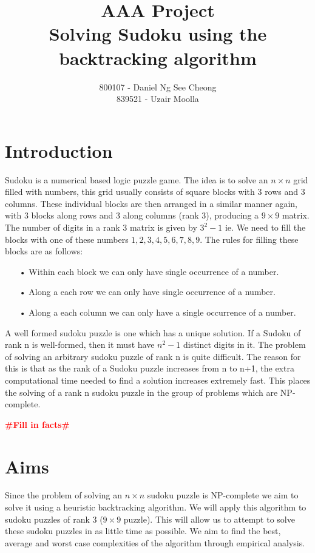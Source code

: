 \documentclass[12pt,a4paper,titlepage]{article}
\author{800107 - Daniel Ng See Cheong\\
		839521 - Uzair Moolla}
\title{
	AAA Project\\
	\large Solving Sudoku using the backtracking algorithm
}
\newcommand{\todo}[1]{\textcolor{red}{\textbf{\##1\#}}}
\begin{document}
\maketitle

\section{Introduction}
Sudoku is a numerical based logic puzzle game. The idea is to solve an $n\times n$ grid filled with numbers, this grid usually consists of square blocks with 3 rows and 3 columns. These individual blocks are then arranged in a similar manner again, with 3 blocks along rows and 3 along columns (rank 3), producing a $9 \times 9$ matrix. The number of digits in a rank 3 matrix is given by $3^2-1$ ie. We need to fill the blocks with one of these numbers ${1,2,3,4,5,6,7,8,9}$. The rules for filling these blocks are as follows:
\begin{itemize}
\item[•] Within each block we can only have single occurrence of a number.
\item[•] Along a each row we can only have single occurrence of a number.
\item[•] Along a each column we can only have a single occurrence of a number.
\end{itemize}

A well formed sudoku puzzle is one which has a unique solution. If a Sudoku of rank n is well-formed, then it must have $n^2-1$ distinct digits in it. The problem of solving an arbitrary sudoku puzzle of rank n is quite difficult. The reason for this is that as the rank of a Sudoku puzzle increases from n to n+1, the extra computational time needed to find a solution increases extremely fast. This places the solving of a rank n sudoku puzzle in the group of problems which are NP-complete. 

\todo{Fill in facts}

\section{Aims}

Since the problem of solving an $n \times n $ sudoku puzzle is NP-complete we aim to solve it using a heuristic backtracking algorithm. We will apply this algorithm to sudoku puzzles of rank 3 ($9 \times 9$ puzzle). This will allow us to attempt to solve these sudoku puzzles in as little time as possible. We aim to find the best, average and worst case complexities of the algorithm through empirical analysis.
\end{document}
